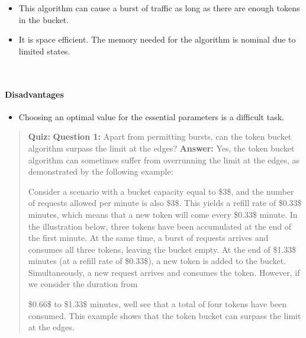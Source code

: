 \begin{itemize}
\item
\protect{}\label{xspT09l539PFnGknVKGna}
This algorithm can cause a burst of traffic as long as there are enough tokens in the bucket.
\item
\protect{}\label{7mEUNKmAqIR75e_qO_e2W}
It is space efficient. The memory needed for the algorithm is nominal due to limited states.
\end{itemize}
\\
\paragraph{Disadvantages}\label{wntOhM5RHY_oE6ZB6_wfj}

\begin{itemize}
\item
\protect{}\label{C12WkYi8WpS8iT7DBdzXQ}
Choosing an optimal value for the essential parameters is a difficult task.
\end{itemize}

\begin{quote}
\textbf{Quiz:}
\textbf{Question 1:} Apart from permitting bursts, can the token bucket algorithm surpass the limit at the edges?
\textbf{Answer:} Yes, the token bucket algorithm can sometimes suffer from overrunning the limit at the edges, as demonstrated by the following example:

Consider a scenario with a bucket capacity equal to \$3\$, and the number of requests allowed per minute is also \$3\$. This yields a refill rate of \$0.33\$ minutes, which means that a new token will come every \$0.33\$ minute. In the illustration below, three tokens have been accumulated at the end of the first minute. At the same time, a burst of requests arrives and consumes all three tokens, leaving the bucket empty. At the end of \$1.33\$ minutes (at a refill rate of \$0.33\$), a new token is added to the bucket. Simultaneously, a new request arrives and consumes the token. However, if we consider the duration from

\$0.66\$ to \$1.33\$ minutes, we\textquotesingle ll see that a total of four tokens have been consumed. This example shows that the token bucket can surpass the limit at the edges.

\end{quote}

